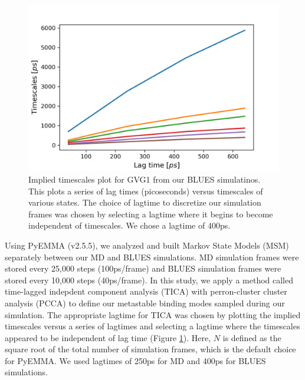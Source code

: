 \begin{figure}
    \centering
    \includegraphics{chapter6/Figures/GVG_1-right_imptimescales.png}
    \caption[Implied Timescales for GVG1]{Implied timescales plot for GVG1 from our BLUES simulatinos. This plots a series of lag times (picoseconds) versus timescales of various states. The choice of lagtime to discretize our simulation frames was chosen by selecting a lagtime where it begins to become independent of timescales. We chose a lagtime of 400ps.}
    \label{fig:GVG_1-right-imptimescales}
\end{figure}

Using PyEMMA (v2.5.5), we analyzed and built Markov State Models (MSM) separately between our MD and BLUES simulations.
MD simulation frames were stored every 25,000 steps (100ps/frame) and BLUES simulation frames were stored every 10,000 steps (40ps/frame).
In this study, we apply a method called time-lagged indepdent component analysis (TICA) with perron-cluster cluster analysis (PCCA) to define our metastable binding modes sampled during our simulation.
The appropriate lagtime for TICA was chosen by plotting the implied timescales versus a series of lagtimes and selecting a lagtime where the timescales appeared to be independent of lag time (Figure \ref{fig:GVG_1-right-imptimescales}).
Here, $N$ is defined as the square root of the total number of simulation frames, which is the default choice for PyEMMA.
We used lagtimes of 250ps for MD and 400ps for BLUES simulations.

